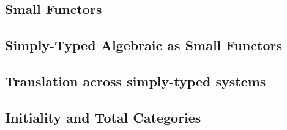 \subsection{Small Functors}

\subsection{Simply-Typed Algebraic as Small Functors}

\subsection{Translation across simply-typed systems}

\subsection{Initiality and Total Categories}
